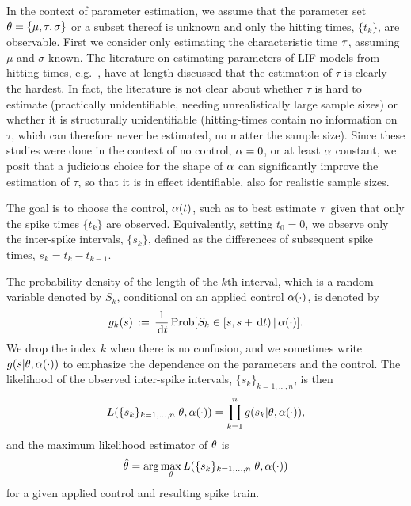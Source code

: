 \documentclass{article}
\begin{document}
In the context of parameter estimation, we assume that the
parameter set ${\theta} = \{{\mu }, { \tau }, {\sigma }\}$ or a subset thereof is unknown and only the hitting times,
$\{t_k\}$, are observable.
First we consider only estimating the characteristic time ${ \tau }$,
assuming $\mu$ and $\sigma$ known. The literature on estimating parameters of
LIF models from hitting times, e.g.\ \cite{Ditlevsen2007,MullowneyIyengar2008}, have
at length discussed that the estimation of $\tau$ is clearly the
hardest. In fact, the literature is not clear about 
whether $\tau$ is hard to estimate (practically unidentifiable,
needing unrealistically large sample sizes) or
whether it is structurally unidentifiable (hitting-times contain no
information on $\tau$, which can therefore never be estimated, no
matter the sample size). Since these studies were done in the
context of no control, ${\alpha}=0$, or at least ${\alpha}$ constant, we posit that
a judicious choice for the shape of ${\alpha}$ can significantly improve the
estimation of $\tau$, so that it is in effect identifiable, also for
realistic sample sizes.

The goal is to choose the control, ${\alpha}(t)$, such as to best estimate ${ \tau }$
given that only the spike times $\{t_k\}$ are observed. Equivalently, setting
$t_0 = 0$, we observe only the inter-spike intervals, $\{s_k\}$,
defined as the differences of subsequent spike times, $s_k = t_k - t_{k-1}$.

The probability density of the length of the $k$th interval, which is a
random variable denoted by $S_k$, conditional on an applied control ${\alpha}(\cdot)$,
is denoted by
\begin{equation} 
g_k(s) \, := \,  \frac{1}{\, \mathrm{d} t} \operatorname{Prob}[S_{k} \in [s, s + \, \mathrm{d} t)  \,|\,
 {\alpha}(\cdot)]. 
\label{eq:ISI_distribution_functions}
\end{equation}
We drop the index $k$ when there is no
confusion, and we sometimes write $g(s|{\theta}, \alpha(\cdot))$ to
emphasize the dependence on the parameters and the control. The
likelihood of the observed inter-spike intervals, $\{s_k\}_{k=1,
  \ldots , n}$, is then
\begin{equation}
L(\{s_k\}_{k=1, \ldots , n} |{\theta}, \alpha(\cdot)) = \prod_{k=1}^n g(s_k|{\theta}, \alpha(\cdot)),
\end{equation}
and the maximum likelihood estimator of ${\theta}$ is
\begin{equation}
\label{MLE}
\hat {{\theta}} = \arg \max_{{\theta}} L(\{s_k\}_{k=1, \ldots , n} |{\theta}, \alpha(\cdot)) 
\end{equation}
for a given applied control and resulting spike train.
\end{document}
